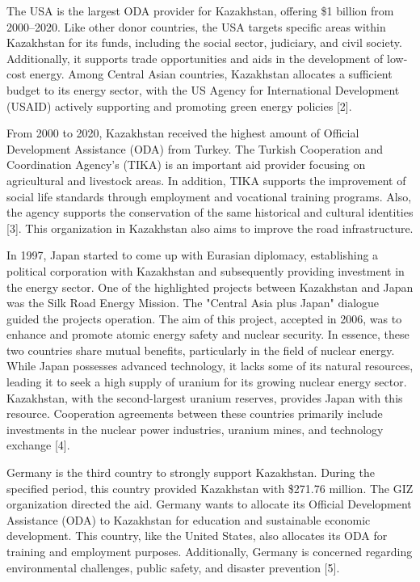 \begin{multicols}{2}
The USA is the largest ODA provider for Kazakhstan, offering \$1 billion
from 2000--2020. Like other donor countries, the USA targets specific
areas within Kazakhstan for its funds, including the social sector,
judiciary, and civil society. Additionally, it supports trade
opportunities and aids in the development of low-cost energy. Among
Central Asian countries, Kazakhstan allocates a sufficient budget to its
energy sector, with the US Agency for International Development (USAID)
actively supporting and promoting green energy policies {[}2{]}.

From 2000 to 2020, Kazakhstan received the highest amount of Official
Development Assistance (ODA) from Turkey. The Turkish Cooperation and
Coordination Agency's (TIKA) is an important aid provider focusing on
agricultural and livestock areas. In addition, TIKA supports the
improvement of social life standards through employment and vocational
training programs. Also, the agency supports the conservation of the
same historical and cultural identities {[}3{]}. This organization in
Kazakhstan also aims to improve the road infrastructure.

In 1997, Japan started to come up with Eurasian diplomacy, establishing
a political corporation with Kazakhstan and subsequently providing
investment in the energy sector. One of the highlighted projects between
Kazakhstan and Japan was the Silk Road Energy Mission. The "Central Asia
plus Japan" dialogue guided the project\textquotesingle s operation. The
aim of this project, accepted in 2006, was to enhance and promote atomic
energy safety and nuclear security. In essence, these two countries
share mutual benefits, particularly in the field of nuclear energy.
While Japan possesses advanced technology, it lacks some of its natural
resources, leading it to seek a high supply of uranium for its growing
nuclear energy sector. Kazakhstan, with the second-largest uranium
reserves, provides Japan with this resource. Cooperation agreements
between these countries primarily include investments in the nuclear
power industries, uranium mines, and technology exchange {[}4{]}.

Germany is the third country to strongly support Kazakhstan. During the
specified period, this country provided Kazakhstan with \$271.76
million. The GIZ organization directed the aid. Germany wants to
allocate its Official Development Assistance (ODA) to Kazakhstan for
education and sustainable economic development. This country, like the
United States, also allocates its ODA for training and employment
purposes. Additionally, Germany is concerned regarding environmental
challenges, public safety, and disaster prevention {[}5{]}.~


\end{multicols}

